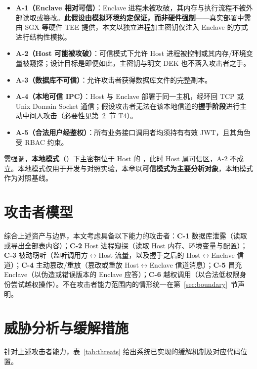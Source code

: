 \begin{itemize}
  \item \textbf{A-1（Enclave 相对可信）}：Enclave 进程未被攻破，其内存与执行流程不被外部读取或篡改。\textbf{此假设由模拟环境约定保证，而非硬件强制}——真实部署中需由 SGX 等硬件 TEE 提供，本文以独立进程加主密钥仅注入 Enclave 的方式进行结构性模拟。
  \item \textbf{A-2（Host 可能被攻破）}：可信模式下允许 Host 进程被控制或其内存/环境变量被窥探；设计目标是即便如此，主密钥与明文 DEK 也不落入攻击者之手。
  \item \textbf{A-3（数据库不可信）}：允许攻击者获得数据库文件的完整副本。
  \item \textbf{A-4（本地可信 IPC）}：Host 与 Enclave 部署于同一主机，经环回 TCP 或 Unix Domain Socket 通信；假设攻击者无法在该本地信道的\textbf{握手阶段}进行主动中间人攻击（必要性见第~\ref{sec:threat-analysis}~节 T4）。
  \item \textbf{A-5（合法用户经鉴权）}：所有业务接口调用者均须持有有效 JWT，且其角色受 RBAC 约束。
\end{itemize}

需强调，\textbf{本地模式}（）下主密钥位于 Host 的 ，此时 Host 属可信区，A-2 不成立。本地模式仅用于开发与对照实验，本章以\textbf{可信模式为主要分析对象}，本地模式作为对照基线。

\section{攻击者模型}

综合上述资产与边界，本文考虑具备以下能力的攻击者：\textbf{C-1} 数据库泄露（读取或导出全部表内容）；\textbf{C-2} Host 进程窥探（读取 Host 内存、环境变量与配置）；\textbf{C-3} 被动窃听（监听调用方$\leftrightarrow$Host 流量，以及握手之后的 Host$\leftrightarrow$Enclave 信道）；\textbf{C-4} 主动篡改/重放（篡改或重放 Host$\leftrightarrow$Enclave 信道消息）；\textbf{C-5} 冒充 Enclave（以伪造或错误版本的 Enclave 应答）；\textbf{C-6} 越权调用（以合法低权限身份尝试越权操作）。不在攻击者能力范围内的情形统一在第~\ref{sec:boundary}~节声明。

\section{威胁分析与缓解措施}
\label{sec:threat-analysis}

针对上述攻击者能力，表~\ref{tab:threats} 给出系统已实现的缓解机制及对应代码位置。

